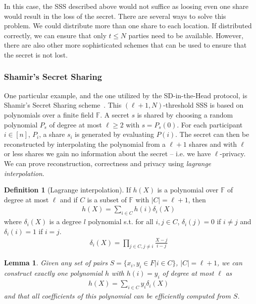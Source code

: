 \documentclass[11pt]{report}
\theoremstyle{definition}
\newtheorem{definition}{Definition}[section]
\theoremstyle{plain}
\newtheorem{lemma}{Lemma}[section]
\begin{document}
In this case, the SSS described above would not suffice as loosing even one share would result in the loss of the secret. There are several ways to solve this problem. We could distribute more than one share to each location. If distributed correctly, we can ensure that only $t \leq N$ parties need to be available. However, there are also other more sophisticated schemes that can be used to ensure that the secret is not lost.

\subsubsection{Shamir's Secret Sharing}\label{sub:shamir}

One particular example, and the one utilized by the SD-in-the-Head protocol, is Shamir's Secret Sharing scheme~\cite{shamir1979share,cramer2015secure}. This $(\ell + 1, N)$-threshold SSS is based on polynomials over a finite field $\mathbb{F}$. A secret $s$ is shared by choosing a random polynomial $P_s$ of degree at most $\ell \geq 2$ with $s = P_s(0)$. For each participant $i \in [n]$, $P_i$, a share $s_i$ is generated by evaluating $P(i)$. The secret can then be reconstructed by interpolating the polynomial from a $\ell + 1$ shares and with $\ell$ or less shares we gain no information about the secret -- i.e. we have $\ell$-privacy. We can prove reconstruction, correctness and privacy using \textit{lagrange interpolation}.

\begin{definition}[Lagrange interpolation]\label{def:lagrange}
  If $h(X)$ is a polynomial over $\mathbb{F}$ of degree at most $\ell$ and if $C$ is a subset of $\mathbb{F}$ with $|C| = \ell + 1$, then
  \begin{align}\label{eq:lagrange1}
    h(X) = \sum_{i\in C}h(i)\delta_i(X)
  \end{align}
  where $\delta_i(X)$ is a degree $l$ polynomial s.t. for all $i,j \in C$, $\delta_i(j) = 0$ if $i \neq j$ and $\delta_i(i) = 1$ if $i = j$.
  \begin{align}\label{eq:lagrange2}
    \delta_i(X) = \prod_{j \in C,j\neq i} \frac{X-j}{i-j}
  \end{align}
\end{definition}

\begin{lemma}\label{lem:lagrange}
  Given any set of pairs $S = \{x_i, y_i \in F| i \in C\}$, $|C| = \ell + 1$, we can construct exactly one polynomial $h$ with $h(i) = y_i$ of degree at most $\ell$ as
  \begin{align*}
    h(X) = \sum_{i \in C} y_i \delta_i(X)
  \end{align*}
  \noindent and that all coefficients of this polynomial can be efficiently computed from $S$.
\end{lemma}
\end{document}
